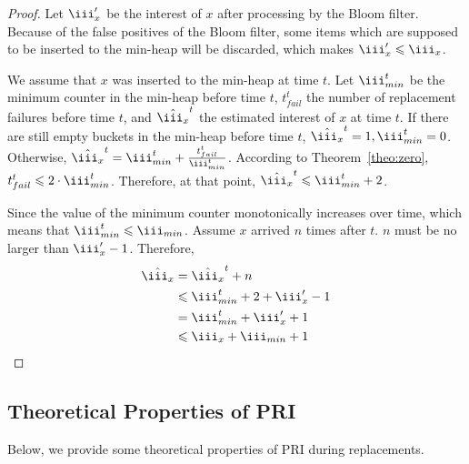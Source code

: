 \begin{proof}
Let $\iii_x^\prime$ be the interest of $x$ after processing by the Bloom filter. Because of the false positives of the Bloom filter, some items which are supposed to be inserted to the min-heap will be discarded, which makes $\iii_x^\prime \leqslant \iii_x$.

We assume that $x$ was inserted to the min-heap at time $t$. 
Let $\iii_{min}^t$ be the minimum counter in the min-heap before time $t$, $t_{fail}^t$ the number of replacement failures before time $t$, and $\hat{\iii_x}^t$ the estimated interest of $x$ at time $t$. If there are still empty buckets in the min-heap before time $t$, $\hat{\iii_x}^t = 1, \iii_{min}^t = 0$. 
Otherwise, $\hat{\iii_x}^t = \iii_{min}^t + \frac{t_{fail}^t}{\iii_{min}^t}$.
According to Theorem~\ref{theo:zero}, $t_{fail}^t \leqslant 2\cdot\iii_{min}^t$. 
Therefore, at that point, $\hat{\iii_x}^t \leqslant \iii_{min}^t + 2$.

Since the value of the minimum counter monotonically increases over time, which means that $\iii_{min}^t \leqslant \iii_{min}$. Assume $x$ arrived $n$ times after $t$. 
$n$ must be no larger than $\iii_x^\prime - 1$.
Therefore,
\begin{equation}
\begin{aligned}
\centering  
\hat{\iii_x} &= \hat{\iii_x}^t + n\\
&\leqslant \iii_{min}^t + 2 + \iii_x^\prime - 1\\ 
&= \iii_{min}^t + \iii_x^\prime + 1 \\
&\leqslant \iii_x + \iii_{min} + 1
\end{aligned}
\end{equation}
\end{proof}

\presub
\subsection{Theoretical Properties of PRI}
\postsub
Below, we provide some theoretical properties of PRI during replacements. 

